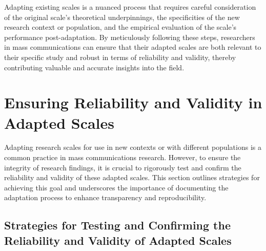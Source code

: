 \documentclass[
]{book}
\begin{document}
Adapting existing scales is a nuanced process that requires careful consideration of the original scale's theoretical underpinnings, the specificities of the new research context or population, and the empirical evaluation of the scale's performance post-adaptation. By meticulously following these steps, researchers in mass communications can ensure that their adapted scales are both relevant to their specific study and robust in terms of reliability and validity, thereby contributing valuable and accurate insights into the field.

\hypertarget{ensuring-reliability-and-validity-in-adapted-scales}{%
\section{Ensuring Reliability and Validity in Adapted Scales}\label{ensuring-reliability-and-validity-in-adapted-scales}}

Adapting research scales for use in new contexts or with different populations is a common practice in mass communications research. However, to ensure the integrity of research findings, it is crucial to rigorously test and confirm the reliability and validity of these adapted scales. This section outlines strategies for achieving this goal and underscores the importance of documenting the adaptation process to enhance transparency and reproducibility.

\hypertarget{strategies-for-testing-and-confirming-the-reliability-and-validity-of-adapted-scales}{%
\subsection*{Strategies for Testing and Confirming the Reliability and Validity of Adapted Scales}\label{strategies-for-testing-and-confirming-the-reliability-and-validity-of-adapted-scales}}
\end{document}
